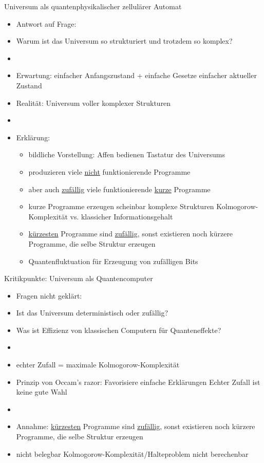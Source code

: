 \documentclass[aspectratio=1610, 9pt]{beamer}
\begin{document}
\begin{frame}{Universum als quantenphysikalischer zellulärer Automat}
  \begin{itemize}
    \item Antwort auf Frage:
    \item Warum ist das Universum so strukturiert und trotzdem so komplex?
    \item[]
    \item Erwartung: einfacher Anfangszustand + einfache Gesetze \rightarrow einfacher aktueller Zustand
    \item Realität: Universum voller komplexer Strukturen
    \item[]
    \item Erklärung:
    \begin{itemize}
      \item bildliche Vorstellung: Affen bedienen Tastatur des Universums
      \item produzieren viele \underline{nicht} funktionierende Programme
      \item aber auch \underline{zufällig} viele funktionierende \underline{kurze} Programme
      \item kurze Programme erzeugen scheinbar komplexe Strukturen \rightarrow Kolmogorow-Komplexität vs. klassicher Informationsgehalt
      \item \underline{kürzesten} Programme sind \underline{zufällig}, sonst existieren noch kürzere Programme, die selbe Struktur erzeugen
      \item[\rightarrow] Quantenfluktuation für Erzeugung von zufälligen Bits
    \end{itemize}
  \end{itemize}

\end{frame}

\begin{frame}{Kritikpunkte: Universum als Quantencomputer}
  \begin{itemize}
    \item Fragen nicht geklärt:
    \item[] Ist das Universum deterministisch oder zufällig?
    \item[] Was ist Effizienz von klassischen Computern für Quanteneffekte?
    \item[]
    \item echter Zufall = maximale Kolmogorow-Komplexität
    \item Prinzip von Occam's razor: Favorisiere einfache Erklärungen \rightarrow Echter Zufall ist keine gute Wahl
    \item[]
    \item Annahme: \underline{kürzesten} Programme sind \underline{zufällig}, sonst existieren noch kürzere Programme, die selbe Struktur erzeugen
    \item nicht belegbar \rightarrow Kolmogorow-Komplexität/Halteproblem nicht berechenbar
  \end{itemize}

\end{frame}
\end{document}
